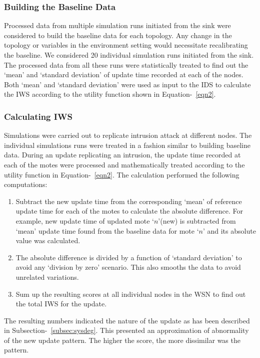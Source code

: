 \documentclass[conference,final]{IEEEtran}
\begin{document}
\subsubsection*{Building the Baseline Data}

Processed data from multiple simulation runs initiated from the sink were considered to build the baseline data for each topology.
Any change in the topology or variables in the environment setting would necessitate recalibrating the baseline.
We considered 20 individual simulation runs initiated from the sink.
The processed data from all these runs were statistically treated to find out the `mean' and `standard deviation' of update time recorded at each of the nodes.
Both `mean' and `standard deviation' were used as input to the IDS to calculate the IWS according to the utility function shown in Equation-~\ref{eqn2}. 

\subsubsection*{Calculating IWS}
Simulations were carried out to replicate intrusion attack at different nodes.
The individual simulations runs were treated in a fashion  similar to building baseline data.
During an update replicating an intrusion, the update time recorded at each of the motes were processed  and mathematically treated according to the utility function in Equation-~\ref{eqn2}. The calculation performed the following computations:
\begin{enumerate}
\item Subtract the new update time from the corresponding `mean' of reference update time for each of the motes to calculate the absolute difference. For example, new update time of updated mote `$n$'(new) is subtracted from `mean' update time found from the baseline data for mote `$n$' and its absolute value was calculated.
\item The absolute difference is divided by a function of `standard deviation' to avoid any `division by zero' scenario. This also smooths the data to avoid unrelated variations.
\item Sum up the resulting scores at all individual nodes in the WSN to find out the total IWS for the update.
\end{enumerate}
The resulting numbers indicated the nature of the update as has been described in Subsection-~\ref{subsec:sysdeg}.
This presented an approximation of abnormality of the new update pattern. The higher the score, the more dissimilar was the pattern. 
\end{document}
